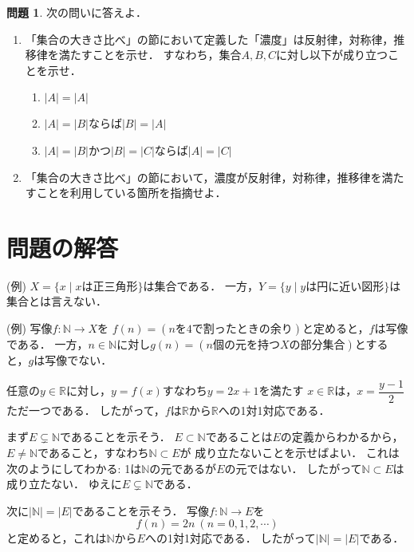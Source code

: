 \documentclass[./main]{subfiles} %
\theoremstyle{definition}
\newtheorem{hamadaqst}[hamadadefi]{問題}
\begin{document}
\begin{hamadaqst}
\label{cardiseq}
次の問いに答えよ．
\begin{enumerate}
\item 「集合の大きさ比べ」の節において定義した「濃度」は反射律，対称律，推移律を満たすことを示せ．
すなわち，集合$A,B,C$に対し以下が成り立つことを示せ．
\begin{enumerate}
\item $|A|=|A|$
\item $|A|=|B|$ならば$|B|=|A|$
\item $|A|=|B|$かつ$|B|=|C|$ならば$|A|=|C|$
\end{enumerate}
\item 「集合の大きさ比べ」の節において，濃度が反射律，対称律，推移律を満たすことを利用している箇所を指摘せよ．
\end{enumerate}
\end{hamadaqst}

\section{問題の解答}
(例)
$X=\{x\mid xは正三角形\}$は集合である．
一方，$Y=\{y\mid yは円に近い図形\}$は集合とは言えない．

(例)
写像$f\colon\mathbb{N}\to X$を
$f(n)=(nを4で割ったときの余り)$と定めると，$f$は写像である．
一方，$n\in\mathbb{N}$に対し$g(n)=(n個の元を持つXの部分集合)$とすると，$g$は写像でない．

任意の$y\in\mathbb{R}$に対し，$y=f(x)$すなわち$y=2x+1$を満たす
$x\in\mathbb{R}$は，$x=\dfrac{y-1}{2}$ただ一つである．
したがって，$f$は$\mathbb{R}$から$\mathbb{R}$への1対1対応である．

まず$E\subsetneq\mathbb{N}$であることを示そう．
$E\subset\mathbb{N}$であることは$E$の定義からわかるから，
$E\neq\mathbb{N}$であること，すなわち$\mathbb{N}\subset E$が
成り立たないことを示せばよい．
これは次のようにしてわかる:
1は$\mathbb{N}$の元であるが$E$の元ではない．
したがって$\mathbb{N}\subset E$は成り立たない．
ゆえに$E\subsetneq\mathbb{N}$である．

次に$|\mathbb{N}|=|E|$であることを示そう．
写像$f\colon\mathbb{N}\to E$を
\[
f(n)=2n\ (n=0,1,2,\cdots)
\]
と定めると，これは$\mathbb{N}$から$E$への1対1対応である．
したがって$|\mathbb{N}|=|E|$である．
\end{document}
